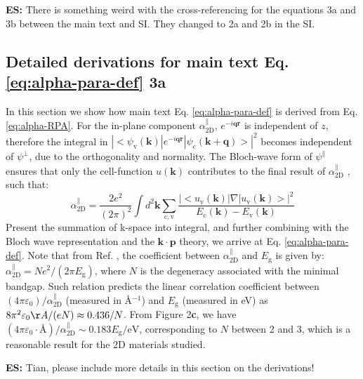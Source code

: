 \documentclass[manuscript=suppinfo,email=true,hyperref=true,keywords=false]{achemso}
\begin{document}
{\bf ES:} There is something weird with the cross-referencing for the equations 3a and 3b between the main text and 
SI. They changed to 2a and 2b in the SI. 


\subsection{Detailed derivations for main text Eq. \ref{eq:alpha-para-def} 3a}  %
\label{sssec:theory-1}

In this section we show how main text Eq. \ref{eq:alpha-para-def}
is derived from Eq. \ref{eq:alpha-RPA}. For the in-plane component
$\alpha_{\mathrm{2D}}^{\parallel}$, $e^{-i\mathbf{qr}}$ is independent
of $z$, therefore the integral in
$|<\psi_{\mathrm{v}}(\mathbf{k})|e^{-i\mathbf{q}\mathbf{r}}|\psi_{\mathrm{c}}(\mathbf{k+q})>|^{2}$
becomes independent of $\psi^{\perp}$, due to the orthogonality
and normality. The Bloch-wave form of $\psi^{\parallel}$ ensures that
only the cell-function $u(\mathbf{k})$ contributes to the final result
of $\alpha^{\parallel}_{\mathrm{2D}}$ \cite{davies_physics_1997}, such
that:
\begin{equation}
  \label{eq:alpha_para_RPA}
  \alpha_{\mathrm{2D}}^{\parallel} = \frac{2e^{2}}
  {(2 \pi)^{2}} \int d^{2}\mathbf{k} \sum_{\mathrm{c, v}}
  \frac{|<u_{\mathrm{v}}(\mathbf{k})|\nabla|u_{\mathrm{v}}(\mathbf{k})>|^{2}}
  {E_{\mathrm{c}}(\mathbf{k}) - E_{\mathrm{v}}(\mathbf{k})}
\end{equation}
Present the summation of k-space into integral, and further combining
with the Bloch wave representation and the
$\mathbf{k} \cdot \mathbf{p}$ theory\cite{Jiang_2017_Eg_Eb}, we arrive
at Eq. \ref{eq:alpha-para-def}. Note that from
Ref. , the coefficient between
$\alpha^{\parallel}_{\mathrm{2D}}$ and $E_{\mathrm{g}}$ is given by:
$\alpha_{\mathrm{2D}}^{\parallel} = N e^{2}/(2\pi E_{\mathrm{g}})$,
where $N$ is the degeneracy associated with the minimal bandgap. Such
relation predicts the linear correlation coefficient between
$(4\pi \varepsilon_{0})/\alpha^{\parallel}_{\mathrm{2D}}$ (measured in
\AA{}$^{-1}$) and $E_{\mathrm{g}}$ (measured in eV) as
$8 \pi^{2} \varepsilon_{0} \AA{} / (e N) \approx 0.436 / N$. From Figure 2{\bf c}, we have
$(4 \pi \varepsilon_{0}\cdot \text{\AA{}})/\alpha_{\mathrm{2D}}^{\parallel}
\sim{} 0.183 E_{\mathrm{g}}/ \mathrm{eV}$, corresponding to $N$
between 2 and 3, which is a reasonable result for the 2D materials
studied. 

{\bf ES:} Tian, please include more details in this section on the derivations! 
\end{document}
